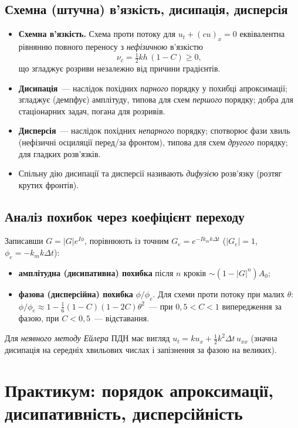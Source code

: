 \documentclass[12pt,a4paper]{article}
\theoremstyle{definition}
\theoremstyle{plain}
\newcommand{\abs}[1]{\left\lvert #1 \right\rvert}
\begin{document}
\subsection{Схемна (штучна) в'язкість, дисипація, дисперсія}
\begin{itemize}[leftmargin=1.4em]
  \item \textbf{Схемна в'язкість.} Схема проти потоку для $u_t+(cu)_x=0$
  еквівалентна рівнянню повного переносу з \emph{нефізичною} в'язкістю
  \begin{equation}
    \nu_c=\tfrac12 k h\,(1-C)\ge0 ,
  \end{equation}
  що згладжує розриви незалежно від причини градієнтів.
  \item \textbf{Дисипація}~--- наслідок похідних \emph{парного} порядку у
  похибці апроксимації; згладжує (демпфує) амплітуду, типова для схем
  \emph{першого} порядку; добра для стаціонарних задач, погана для
  розривів.
  \item \textbf{Дисперсія}~--- наслідок похідних \emph{непарного} порядку;
  спотворює фази хвиль (нефізичні осциляції перед/за фронтом), типова для
  схем \emph{другого} порядку; для гладких розв'язків.
  \item Спільну дію дисипації та дисперсії називають \emph{дифузією}
  розв'язку (розтяг крутих фронтів).
\end{itemize}

\subsection{Аналіз похибок через коефіцієнт переходу}
Записавши $G=\abs{G}e^{I\phi}$, порівнюють із точним
$G_e=e^{-Ik_m k\Delta t}$ ($\abs{G_e}=1$, $\phi_e=-k_m k\Delta t$):
\begin{itemize}[leftmargin=1.4em]
  \item \textbf{амплітудна (дисипативна) похибка} після $n$ кроків
  $\sim(1-\abs{G}^n)A_0$;
  \item \textbf{фазова (дисперсійна) похибка} $\phi/\phi_e$. Для схеми
  проти потоку при малих $\theta$:\;
  $\phi/\phi_e\approx1-\tfrac16(1-C)(1-2C)\theta^2$~--- при $0,5<C<1$
  випередження за фазою, при $C<0,5$~--- відставання.
\end{itemize}
Для \emph{неявного методу Ейлера} ПДН має вигляд
$u_t=ku_x+\tfrac12 k^2\Delta t\,u_{xx}$ (значна дисипація на середніх
хвильових числах і запізнення за фазою на великих).

\newpage
\section{Практикум: порядок апроксимації, дисипативність, дисперсійність}
\end{document}
